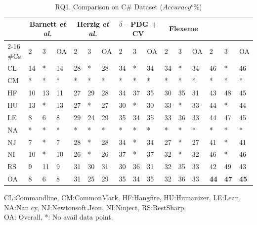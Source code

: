 \begin{table}[t]
	\caption{RQ1. Comparison on C\# Dataset ($Accuracy^c$\%)}
	\vspace{-12pt}
	\begin{center}
		\small
                \tabcolsep 3.4pt
		\renewcommand{\arraystretch}{1} \begin{tabular}{p{0.3cm}<{\centering}|p{0.25cm}<{\centering}p{0.25cm}<{\centering}p{0.25cm}<{\centering}|p{0.25cm}<{\centering}p{0.25cm}<{\centering}p{0.25cm}<{\centering}|p{0.25cm}<{\centering}p{0.25cm}<{\centering}p{0.25cm}<{\centering}|p{0.25cm}<{\centering}p{0.25cm}<{\centering}p{0.25cm}<{\centering}|p{0.25cm}<{\centering}p{0.25cm}<{\centering}p{0.25cm}<{\centering}}
			
			\hline
		\multirow{2}{*}{}          & \multicolumn{3}{c|}{Barnett {\em et al.}} & \multicolumn{3}{c|}{Herzig {\em et al.}} & \multicolumn{3}{c|}{$\delta-$PDG + CV} & \multicolumn{3}{c|}{Flexeme} & \multicolumn{3}{c}{\bf {\tool}}\\
		\cline{2-16}
	\#Cs	 & 2 & 3 & OA & 2 & 3 & OA & 2 & 3 & OA & 2 & 3 & OA & 2 & 3 & OA \\
			\hline
			CL   & 14 & *    & 14 & 28 & *    & 28 & 34 & *    & 34 & 34 & *    & 34 & 46 & *    & 46 \\
			CM   & *    & *    & *    & *    & *    & *    & *    & *    & *    & *    & *    & *    & *    & *    & *    \\
			HF   & 10 & 13 & 11 & 27 & 29 & 28 & 34 & 37 & 35 & 30 & 35 & 31 & 43 & 48 & 45 \\
			HU   & 13 & *    & 13 & 27 & *    & 27 & 30 & *    & 30 & 33 & *    & 33 & 44 & *    & 44 \\
			LE   & 8 & 6 & 8 & 29 & 24 & 29 & 35 & 34 & 35 & 33 & 36 & 33 & 44 & 47 & 45\\
			NA   & *    & *    & *    & *    & *    & *    & *    & *    & *    & *    & *    & *    & *    & *    & *    \\
			NJ   & 7 & *    & 7 & 28 & *    & 28 & 34 & *    & 34 & 27 & *    & 27 & 41 & *    & 41 \\
			NI   & 10 & *    & 10 & 26 & *    & 26 & 37 & *    & 37 & 32 & *    & 32 & 46 & *    & 46 \\
			RS   & 9 & 11 & 9 & 31 & 30 & 31 & 30 & 36 & 31 & 32 & 35 & 33 & 42 & 49 & 43\\
			\hline
			OA   & 8 & 6 & 8 & 31 & 25 & 29 & 35 & 34 & 35 & 32 & 36 & 33 & {\bf 44} & {\bf 47} & {\bf 45} \\
			\hline
		\end{tabular}
		\label{RQ1-result-1}
		CL:Commandline, CM:CommonMark, HF:Hangfire, HU:Humanizer, LE:Lean, NA:Nan cy, NJ:Newtonsoft.Json, NI:Ninject, RS:RestSharp,\\ OA: Overall, *: No avail data point.
	\end{center}
        \vspace{-4pt}
\end{table}




